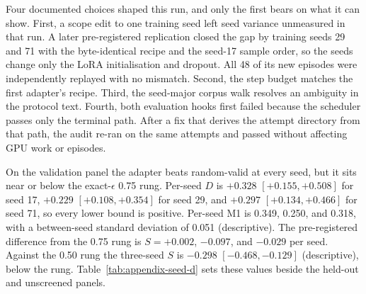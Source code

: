 Four documented choices shaped this run, and only the first bears on what it can show. First, a scope edit to one training seed left seed variance unmeasured in that run. A later pre-registered replication closed the gap by training seeds 29 and 71 with the byte-identical recipe and the seed-17 sample order, so the seeds change only the LoRA initialisation and dropout. All 48 of its new episodes were independently replayed with no mismatch. Second, the step budget matches the first adapter's recipe. Third, the seed-major corpus walk resolves an ambiguity in the protocol text. Fourth, both evaluation hooks first failed because the scheduler passes only the terminal path. After a fix that derives the attempt directory from that path, the audit re-ran on the same attempts and passed without affecting GPU work or episodes.

On the validation panel the adapter beats random-valid at every seed, but it sits near or below the exact-$\epsilon$ 0.75 rung. Per-seed $D$ is $+0.328$ $[+0.155, +0.508]$ for seed 17, $+0.229$ $[+0.108, +0.354]$ for seed 29, and $+0.297$ $[+0.134, +0.466]$ for seed 71, so every lower bound is positive. Per-seed M1 is 0.349, 0.250, and 0.318, with a between-seed standard deviation of 0.051 (descriptive). The pre-registered difference from the 0.75 rung is $S = +0.002$, $-0.097$, and $-0.029$ per seed. Against the 0.50 rung the three-seed $S$ is $-0.298$ $[-0.468, -0.129]$ (descriptive), below the rung. Table~\ref{tab:appendix-seed-d} sets these values beside the held-out and unscreened panels.

